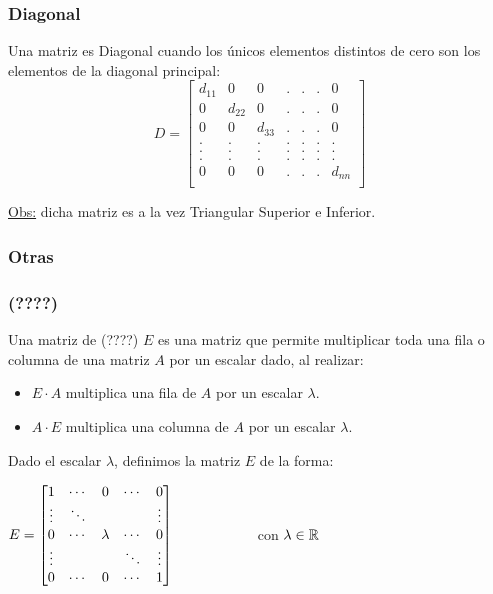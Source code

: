 \subsubsection{Diagonal}
Una matriz es Diagonal cuando los únicos elementos distintos de cero son los elementos
de la diagonal principal:
\begin{equation*}
	D =
	\left [ \begin{array}{ccccccc}
	  d_{11} & 0 & 0 & . & . & .& 0\\
	  0 & d_{22} & 0 & . & . & .& 0\\
	  0 & 0 & d_{33} & . & . & .& 0\\
	  . & . & . & . & . & .& .\\
	  . & . & . & . & . & .& .\\
	  . & . & . & . & . & .& .\\
	  0 & 0 & 0 & . & . & .& d_{nn}\\
	\end{array} \right ]
\end{equation*}

\underline{Obs:} dicha matriz es a la vez Triangular Superior e Inferior.

\subsubsection{Otras}
\subsubsection{(????)}

Una matriz de (????) $E$ es una matriz que permite multiplicar toda una fila o columna de una matriz $A$ por un escalar dado, al realizar:
\begin{itemize}
	\item $E\cdot A$ multiplica una fila de $A$ por un escalar $\lambda$.
	\item $A\cdot E$ multiplica una columna de $A$ por un escalar $\lambda$.
\end{itemize}

Dado el escalar $\lambda$, definimos la matriz $E$ de la forma:
\begin{center}
	$E=\begin{bmatrix}
		1 & \cdots & 0 & \cdots & 0 \\
		\vdots  & \ddots &   &        & \vdots  \\
		0 & \cdots & \lambda & \cdots & 0\\
		\vdots & & &\ddots & \vdots \\
		0&\cdots & 0 & \cdots & 1
	\end{bmatrix} \hspace{2cm}$ con $\lambda\in\mathbb{R}$
\end{center}


